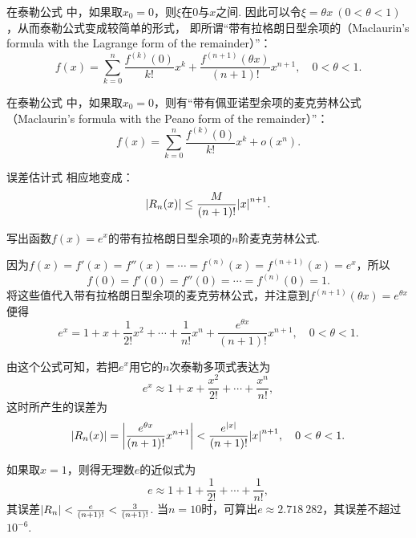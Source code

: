 在泰勒公式  中，如果取\(x_0 = 0\)，则\(\xi\)在\(0\)与\(x\)之间.
因此可以令\(\xi = \theta x\ (0 < \theta < 1)\)，从而泰勒公式变成较简单的形式，
即所谓“带有拉格朗日型余项的（Maclaurin's formula with the Lagrange form of the remainder）”：
\begin{equation}\label{equation:微分中值定理.泰勒公式3}
f(x)=\sum_{k=0}^n \frac{f^{(k)}(0)}{k!} x^k
	+ \frac{f^{(n+1)}(\theta x)}{(n+1)!} x^{n+1},
\quad 0 < \theta < 1.
\end{equation}

在泰勒公式  中，如果取\(x_0 = 0\)，则有“带有佩亚诺型余项的麦克劳林公式（Maclaurin's formula with the Peano form of the remainder）”：
\begin{equation}\label{equation:微分中值定理.泰勒公式4}
f(x)=\sum_{k=0}^n \frac{f^{(k)}(0)}{k!} x^k + o(x^n).
\end{equation}

误差估计式  相应地变成：
\begin{equation}\label{equation:微分中值定理.泰勒公式.误差2}
\abs{R_n(x)} \leq \frac{M}{(n+1)!} \abs{x}^{n+1}.
\end{equation}

\begin{example}
写出函数\(f(x) = e^x\)的带有拉格朗日型余项的\(n\)阶麦克劳林公式.
\begin{solution}
因为\(f(x)=f'(x)=f''(x)=\dotsb=f^{(n)}(x)=f^{(n+1)}(x)=e^x\)，所以\[
f(0)=f'(0)=f''(0)=\dotsb=f^{(n)}(0)=1.
\]将这些值代入带有拉格朗日型余项的麦克劳林公式，并注意到\(f^{(n+1)}(\theta x) = e^{\theta x}\)便得\[
e^x = 1 + x + \frac{1}{2!} x^2 + \dotsb + \frac{1}{n!} x^n + \frac{e^{\theta x}}{(n+1)!} x^{n+1}, \quad 0 < \theta < 1.
\]

由这个公式可知，若把\(e^x\)用它的\(n\)次泰勒多项式表达为\[
e^x \approx 1 + x + \frac{x^2}{2!} + \dotsb + \frac{x^n}{n!},
\]这时所产生的误差为\[
\abs{R_n(x)} = \abs{\frac{e^{\theta x}}{(n+1)!} x^{n+1}}
< \frac{e^{\abs{x}}}{(n+1)!} \abs{x}^{n+1},
\quad 0 < \theta < 1.
\]

如果取\(x = 1\)，则得无理数\(e\)的近似式为\[
e \approx 1 + 1 + \frac{1}{2!} + \dotsb + \frac{1}{n!},
\]其误差\(\abs{R_n} < \frac{e}{(n+1)!} < \frac{3}{(n+1)!}\).
当\(n=10\)时，可算出\(e \approx 2.718\ 282\)，其误差不超过\(10^{-6}\).
\end{solution}
\end{example}

